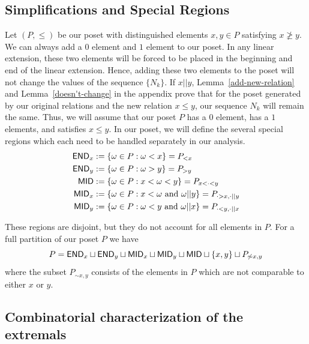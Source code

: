 \documentclass{puthesis-UG}
\begin{document}
\subsection{Simplifications and Special Regions}

Let $(P, \leq)$ be our poset with distinguished elements $x, y \in P$ satisfying $x \not \geq y$. We can always add a $0$ element and $1$ element to our poset. In any linear extension, these two elements will be forced to be placed in the beginning and end of the linear extension. Hence, adding these two elements to the poset will not change the values of the sequence $\{N_k\}$. If $x || y$, Lemma~\ref{add-new-relation} and Lemma~\ref{doesn't-change} in the appendix prove that for the poset generated by our original relations and the new relation $x \leq y$, our sequence $N_k$ will remain the same. Thus, we will assume that our poset $P$ has a $0$ element, has a $1$ elements, and satisfies $x \leq y$. In our poset, we will define the several special regions which each need to be handled separately in our analysis.
\begin{align*}
		\mathsf{END}_x & := \{\omega \in P : \omega < x\} = P_{< x} \\
		\mathsf{END}_y & := \{\omega \in P : \omega > y\} = P_{> y} \\
		\mathsf{MID} & := \{\omega \in P : x < \omega < y\} = P_{x < \cdot < y} \\
		\mathsf{MID}_x & := \{\omega \in P : x < \omega \text{ and } \omega || y\} = P_{\cdot > x, \cdot || y} \\
		\mathsf{MID}_y & := \{\omega \in P : \omega < y \text{ and } \omega || x\} = P_{\cdot < y, \cdot || x} \\
\end{align*}

These regions are disjoint, but they do not account for all elements in $P$. For a full partition of our poset $P$ we have 
\[
	P = \mathsf{END}_x \sqcup \mathsf{END}_y \sqcup \mathsf{MID}_x \sqcup \mathsf{MID}_y \sqcup \mathsf{MID} \sqcup \{x, y\} \sqcup P_{\not\sim x, y}
\]
where the subset $P_{\sim x, y}$ consists of the elements in $P$ which are not comparable to either $x$ or $y$. 

\subsection{Combinatorial characterization of the extremals}
\end{document}
